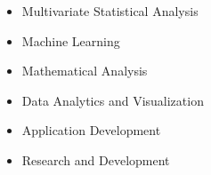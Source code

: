

\begin{cvexpertise}
  \begin{itemize}
    \item Multivariate Statistical Analysis
    \item Machine Learning
    \item Mathematical Analysis
    \vfill
    \item Data Analytics and Visualization
    \item Application Development
    \item Research and Development
  \end{itemize}
\end{cvexpertise}

